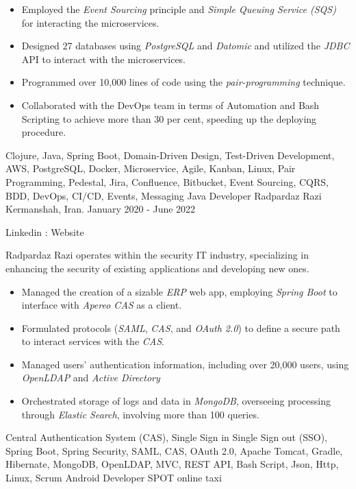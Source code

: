 \begin{experiences}
{\begin{itemize}
  \item Employed the \textit{Event Sourcing} principle and \textit{Simple Queuing Service (SQS)} for interacting the microservices.
  \item Designed 27 databases using \emph{PostgreSQL} and \emph{Datomic} and utilized the \emph{JDBC} API to interact with the microservices.
  \item Programmed over 10,000 lines of code using the \emph{pair-programming} technique.
  \item Collaborated with the DevOps team in terms of Automation and Bash Scripting to achieve more than 30 per cent, speeding up the deploying procedure.
  \end{itemize}}{Clojure, Java, Spring Boot, Domain-Driven Design, Test-Driven Development, AWS, PostgreSQL, Docker, Microservice, Agile, Kanban, Linux, Pair Programming, Pedestal, Jira, Confluence, Bitbucket, Event Sourcing, CQRS, BDD, DevOps, CI/CD, Events, Messaging}
  \emptySeparator
\experience
{}
{Java Developer}
{Radpardaz Razi}
{Kermanshah, Iran. \hspace{170 pt} January 2020 - June 2022}
{}
{
Linkedin : 
Website 
\par{Radpardaz Razi operates within the security IT industry, specializing in enhancing the security of existing applications and developing new ones.}
\begin{itemize}
\item Managed the creation of a sizable \emph{ERP} web app, employing \emph{Spring Boot} to interface with \emph{Apereo CAS} as a client.
\item Formulated protocols (\emph{SAML}, \emph{CAS}, and \emph{OAuth 2.0}) to define a secure path to interact services with the \textit{CAS}.
\item Managed users' authentication information, including over 20,000 users, using \emph{OpenLDAP} and \emph{Active Directory}
\item Orchestrated storage of logs and data in \emph{MongoDB}, overseeing processing through \emph{Elastic Search}, involving more than 100 queries.
\end{itemize}
}{Central Authentication System (CAS), Single Sign in Single Sign out (SSO), Spring Boot, Spring Security, SAML, CAS, OAuth 2.0, Apache Tomcat, Gradle, Hibernate, MongoDB, OpenLDAP, MVC, REST API, Bash Script, Json, Http, Linux, Scrum}
\emptySeparator
\experience
  {}
  {Android Developer}
  {SPOT online taxi}

\end{experiences}
